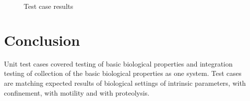 \begin{figure}[H]
	  \centering
	  \caption{Test case results}
	  \label{TestCaseResults}
  \end{figure}

\section{Conclusion}  
Unit test cases covered testing of basic biological properties and integration testing of collection of the basic biological properties as one system.
Test cases are matching expected results of biological settings of intrinsic parameters, with confinement, with motility and with proteolysis.

